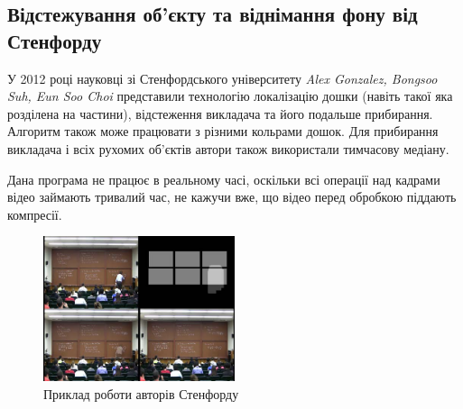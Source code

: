 \subsection{Відстежування об'єкту та віднімання фону від Стенфорду}

У 2012 році науковці зі Стенфордського університету \textit{Alex Gonzalez, 
Bongsoo Suh, Eun Soo Choi} представили технологію \cite{sah} локалізацію дошки
(навіть такої яка розділена на частини), відстеження викладача та його
подальше прибирання. Алгоритм також може працювати з різними кольрами
дошок. Для прибирання викладача і всіх рухомих об'єктів автори також 
використали тимчасову медіану.

Дана програма не працює в реальному часі, оскільки всі операції над кадрами
відео займають тривалий час, не кажучи вже, що відео перед обробкою 
піддають компресії.


\begin{figure}[h]
  \centering
  \includegraphics[width=0.5\textwidth]{images/sah}
  \caption{Приклад роботи авторів Стенфорду}
  \label{fig:sah}
\end{figure}






